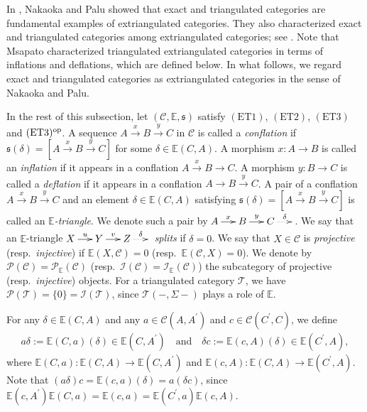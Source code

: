 \documentclass[12pt]{amsart}
\makeatletter
\numberwithin{equation}{subsection}
\theoremstyle{plain}
\theoremstyle{definition}
\newcommand{\Proj}{\mathcal{P}}
\newcommand{\Inj}{\mathcal{I}}
\newcommand{\T}{\mathcal{T}}
\newcommand{\C}{\mathcal{C}}
\newcommand{\op}{{\rm op}}
\newcommand{\E}{\mathbb{E}}
\newcommand{\s}{\mathfrak{s}}
\newcommand{\tri}[6]{\!\!\xymatrix@C=5mm{#1\ar[r]^-{#2}&#3\ar[r]^-{#4}&#5\ar@{..>}[r]^-{#6}&}\!\!}
\makeatother
\begin{document}
In \cite[Example 2.13 and Proposition 3.22]{Nakaoka-Palu_2019_extriangulated}, Nakaoka and Palu showed that exact and triangulated categories are fundamental examples of extriangulated categories.
They also characterized exact and triangulated categories among extriangulated categories; see \cite[Corollaries 3.18 and 7.6]{Nakaoka-Palu_2019_extriangulated}.
Note that Msapato \cite[Theorem 3.3]{Msapato_2025} characterized triangulated extriangulated categories in terms of inflations and deflations, which are defined below.
In what follows, we regard exact and triangulated categories as extriangulated categories in the sense of Nakaoka and Palu.




In the rest of this subsection, let $(\C, \E, \s)$ satisfy $(\mathrm{ET}1)$, $(\mathrm{ET}2)$, $(\mathrm{ET}3)$ and $(\mathrm{ET}3)^\op$.
A sequence $A \xrightarrow{x} B \xrightarrow{y} C$ in $\C$ is called a {\it conflation} if  $\s(\delta)=[A \xrightarrow{x} B \xrightarrow{y} C]$ for some $\delta \in \E(C, A)$.
A morphism $x : A\to B$ is called an {\it inflation} if it appears in a conflation $A \xrightarrow{x} B \xrightarrow{} C$.
A morphism $y : B\to C$ is called a {\it deflation} if it appears in a conflation  $A \xrightarrow{} B \xrightarrow{y} C$.
A pair of a conflation $A \xrightarrow{x} B \xrightarrow{y} C$ and an element $\delta \in \E(C, A)$ satisfying $\s(\delta)=[A \xrightarrow{x} B \xrightarrow{y} C]$ is called an {\it $\E$-triangle}.
We denote such a pair by $\tri{A}{x}{B}{y}{C}{\delta}$.
We say that an $\E$-triangle $\tri{X}{u}{Y}{v}{Z}{\delta}$ {\it splits} if $\delta=0$.
We say that $X\in\C$ is {\it projective} (resp.~{\it injective}) if  $\E(X, \C)=0$ (resp.~$\E(\C, X)=0$). 
We denote by $\Proj(\C) = \Proj_\E(\C)$ (resp.~$\Inj(\C)=\Inj_\E(\C)$) the subcategory of projective (resp.~{\it injective}) objects.
For a triangulated category $\T$, we have $\Proj(\T)=\{0\}=\Inj(\T)$, since $\T(-, \Sigma-)$ plays a role of $\E$.





For any $\delta\in\E(C,A)$ and any $a \in\C(A,A^\prime)$ and $c\in\C(C^\prime, C)$, we define 
\begin{align}
a\delta:=\E(C, a)(\delta)\in\E(C, A^\prime)
\quad\text{and}\quad
\delta c :=\E(c,A)(\delta)\in\E(C^\prime, A),
\end{align}
where $\E(C, a):  \E(C, A) \to  \E(C, A^\prime)$ and $\E(c, A):  \E(C, A) \to  \E(C^\prime, A)$.
Note that $(a\delta) c = \E(c, a)(\delta) = a(\delta c)$, since $\E(c, A^\prime) \E(C, a)  = \E(c, a) = \E(C^\prime, a) \E(c, A)$.
\end{document}
